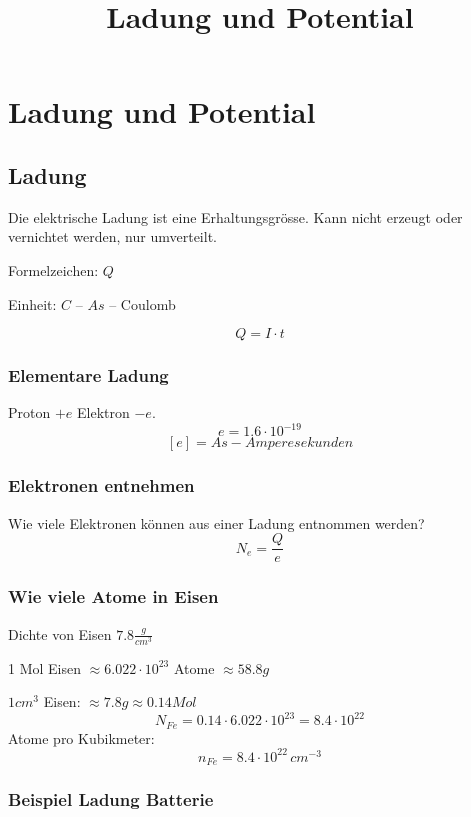 \documentclass[a4paper,12pt]{article}
\title{Ladung und Potential}
\author{}
\date{}
\begin{document}
    
    \maketitle
    \tableofcontents
    
    \section{Ladung und Potential}
    
    \subsection{Ladung}
    Die elektrische Ladung ist eine Erhaltungsgrösse. Kann nicht erzeugt oder vernichtet werden, nur umverteilt.
    
    Formelzeichen: $Q$
    
    Einheit: $C$ – $As$ – Coulomb
    
    $$Q = I \cdot t$$
    
    \subsubsection{Elementare Ladung}
    Proton $+e$ Elektron $-e.$
    $$e = 1.6 \cdot 10^{-19}$$
    $$[e] = As - Amperesekunden$$
    
    \subsubsection{Elektronen entnehmen}
    Wie viele Elektronen können aus einer Ladung entnommen werden?
    $$N_e = \frac{Q}{e}$$
    
    \subsubsection{Wie viele Atome in Eisen}
    Dichte von Eisen $7.8\frac{g}{cm^3}$
    
    1 Mol Eisen $\approx 6.022 \cdot 10^{23}$ Atome $\approx 58.8g$
    
    $1cm^3$ Eisen: $\approx 7.8g \approx 0.14 Mol$
    $$N_{Fe} = 0.14 \cdot 6.022\cdot10^{23} = 8.4 \cdot 10^{22}$$
    Atome pro Kubikmeter:
    $$n_{Fe}=8.4\cdot10^{22}\,cm^{-3}$$
    
    \subsubsection{Beispiel Ladung Batterie}
    
\end{document}
